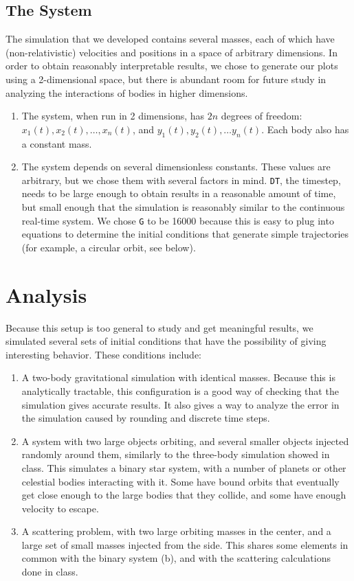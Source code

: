 \documentclass[cm, 10pt]{article}
\begin{document}
\subsection{The System}
The simulation that we developed contains several masses, each of
which have (non-relativistic) velocities and positions in a space of
arbitrary dimensions. In order to obtain reasonably interpretable
results, we chose to generate our plots using a 2-dimensional space,
but there is abundant room for future study in analyzing the
interactions of bodies in higher dimensions.
\begin{enumerate}
  \item The system, when run in 2 dimensions, has $2n$ degrees of
    freedom: $x_1(t), x_2(t), \ldots, x_n(t)$, and $y_1(t), y_2(t),
    \ldots y_n(t)$. Each body also has a constant mass.
  \item The system depends on several dimensionless constants. These
    values are arbitrary, but we chose them with several factors in
    mind. \texttt{DT}, the timestep, needs to be large enough to
    obtain results in a reasonable amount of time, but small enough
    that the simulation is reasonably similar to the continuous
    real-time system. We chose \texttt{G} to be 16000 because this is
    easy to plug into equations to determine the initial conditions
    that generate simple trajectories (for example, a circular orbit,
    see below).
\end{enumerate}


\section{Analysis}
Because this setup is too general to study and get meaningful results,
we simulated several sets of initial conditions that have the
possibility of giving interesting behavior. These conditions include:
\begin{enumerate}
  \item A two-body gravitational simulation with identical masses.
    Because this is analytically tractable, this configuration is a
    good way of checking that the simulation gives accurate results.
    It also gives a way to analyze the error in the simulation caused
    by rounding and discrete time steps.
  \item A system with two large objects orbiting, and several smaller
    objects injected randomly around them, similarly to the three-body
    simulation showed in class. This simulates a binary star system,
    with a number of planets or other celestial bodies interacting
    with it. Some have bound orbits that eventually get close enough
    to the large bodies that they collide, and some have enough
    velocity to escape.
  \item A scattering problem, with two large orbiting masses in the
    center, and a large set of small masses injected from the side.
    This shares some elements in common with the binary system (b),
    and with the scattering calculations done in class.
\end{enumerate}
\end{document}

